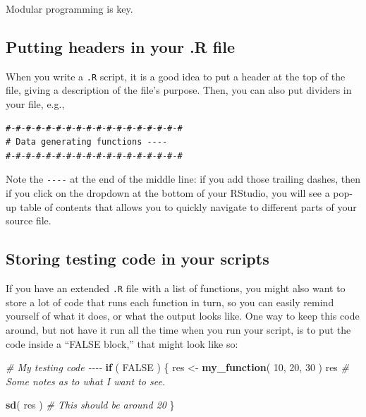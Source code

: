 \documentclass[
]{book}
\newenvironment{Shaded}{\begin{snugshade}}{\end{snugshade}}
\newcommand{\CommentTok}[1]{\textcolor[rgb]{0.56,0.35,0.01}{\textit{#1}}}
\newcommand{\ConstantTok}[1]{\textcolor[rgb]{0.56,0.35,0.01}{#1}}
\newcommand{\ControlFlowTok}[1]{\textcolor[rgb]{0.13,0.29,0.53}{\textbf{#1}}}
\newcommand{\DecValTok}[1]{\textcolor[rgb]{0.00,0.00,0.81}{#1}}
\newcommand{\FunctionTok}[1]{\textcolor[rgb]{0.13,0.29,0.53}{\textbf{#1}}}
\newcommand{\NormalTok}[1]{#1}
\newcommand{\OtherTok}[1]{\textcolor[rgb]{0.56,0.35,0.01}{#1}}
\begin{document}
Modular programming is key.

\subsection{Putting headers in your .R file}\label{putting-headers-in-your-.r-file}

When you write a \texttt{.R} script, it is a good idea to put a header at the top of the file, giving a description of the file's purpose.
Then, you can also put dividers in your file, e.g.,

\begin{verbatim}
#-#-#-#-#-#-#-#-#-#-#-#-#-#-#-#-#-#
# Data generating functions ----
#-#-#-#-#-#-#-#-#-#-#-#-#-#-#-#-#-#
\end{verbatim}

Note the \texttt{-\/-\/-\/-} at the end of the middle line: if you add those trailing dashes, then if you click on the dropdown at the bottom of your RStudio, you will see a pop-up table of contents that allows you to quickly navigate to different parts of your source file.

\subsection{Storing testing code in your scripts}\label{about-keeping-tests-with-FALSE}

If you have an extended \texttt{.R} file with a list of functions, you might also want to store a lot of code that runs each function in turn, so you can easily remind yourself of what it does, or what the output looks like.
One way to keep this code around, but not have it run all the time when you run your script, is to put the code inside a ``FALSE block,'' that might look like so:

\begin{Shaded}
\begin{Highlighting}[]
\CommentTok{\# My testing code {-}{-}{-}{-}}
\ControlFlowTok{if}\NormalTok{ ( }\ConstantTok{FALSE}\NormalTok{ ) \{}
\NormalTok{  res }\OtherTok{\textless{}{-}} \FunctionTok{my\_function}\NormalTok{( }\DecValTok{10}\NormalTok{, }\DecValTok{20}\NormalTok{, }\DecValTok{30}\NormalTok{ )}
\NormalTok{  res}
  \CommentTok{\# Some notes as to what I want to see.}
  
  \FunctionTok{sd}\NormalTok{( res )}
  \CommentTok{\# This should be around 20}
\NormalTok{\}}
\end{Highlighting}
\end{Shaded}
\end{document}
